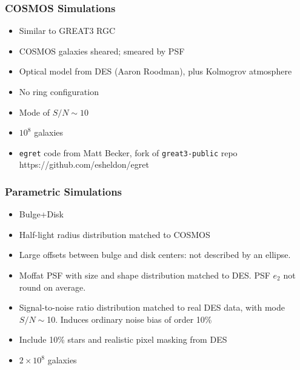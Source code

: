 \documentclass{beamer}
\begin{document}
\frame
{
    \frametitle{COSMOS Simulations}

 
    \begin{itemize}
        \item Similar to {\color{lightskyblue} GREAT3 RGC}

        \item COSMOS galaxies sheared; smeared by PSF

        \item Optical model from DES (Aaron Roodman), plus Kolmogrov atmosphere
        \item {\color{gold} No ring} configuration
        \item Mode of {\color{orange} $S/N \sim 10$}
        \item $10^8$ galaxies

        \item {\color{gold} \texttt{egret}} code from Matt Becker, fork of \texttt{great3-public} repo
            https://github.com/esheldon/egret

    \end{itemize}

}

\frame
{
    \frametitle{Parametric Simulations}

 
    \begin{itemize}

        \item {\color{gold} Bulge+Disk}

        \item Half-light radius distribution matched to COSMOS

        \item Large offsets between bulge and disk centers:
            {\color{lightskyblue} not described by an ellipse}.

        \item Moffat PSF with size and shape distribution
            matched to DES.  PSF $e_2$ not round on average.

        \item Signal-to-noise ratio distribution matched to real DES
            data, with {\color{lightskyblue} mode $S/N \sim$10}.  Induces ordinary noise
            bias of order 10\%
        
        \item Include 10\% {\color{brightred} stars} and realistic pixel
            {\color{orange} masking} from DES

        \item $2 \times 10^8$ galaxies


    \end{itemize}

}
\end{document}
